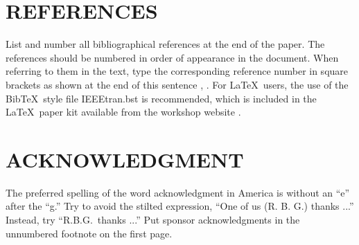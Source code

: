 \documentclass{article}
\begin{document}
\begin{sloppy}
\section{REFERENCES}
\label{sec:ref}

List and number all bibliographical references at the end 
of the paper. The references should be numbered in order 
of appearance in the document. When referring to them in 
the text, type the corresponding reference number in 
square brackets as shown at the end of this sentence 
\cite{cJones2003}, \cite{aSmith2000}. For \LaTeX\ users, 
the use of the Bib\TeX\ style file IEEEtran.bst is 
recommended, which is included in the \LaTeX\ paper 
kit available from the workshop website \cite{aaspweb}.

\section{ACKNOWLEDGMENT}
\label{sec:ack}

The preferred spelling of the word acknowledgment in 
America is without an ``e'' after the ``g.'' Try to avoid 
the stilted expression, ``One of us (R. B. G.) thanks ...''
Instead, try ``R.B.G.\ thanks ...''  Put sponsor 
acknowledgments in the unnumbered footnote on the first page.




% 
%
%
%
% 
%
% 
% 
%
%


\end{sloppy}
\end{document}
